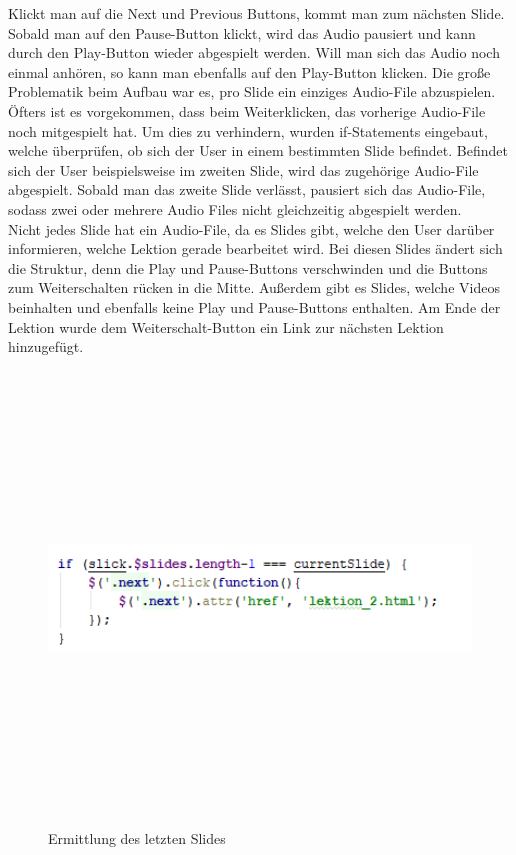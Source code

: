 Klickt man auf die Next und Previous Buttons, kommt man zum nächsten Slide. Sobald man auf den Pause-Button klickt, wird das Audio pausiert und kann durch den Play-Button wieder abgespielt werden. Will man sich das Audio noch einmal anhören, so kann man ebenfalls auf den Play-Button klicken. Die große Problematik beim Aufbau war es, pro Slide ein einziges Audio-File abzuspielen. Öfters ist es vorgekommen, dass beim Weiterklicken, das vorherige Audio-File noch mitgespielt hat. Um dies zu verhindern, wurden if-Statements eingebaut, welche überprüfen, ob sich der User in einem bestimmten Slide befindet. Befindet sich der User beispielsweise im zweiten Slide, wird das zugehörige Audio-File abgespielt. Sobald man das zweite Slide verlässt, pausiert sich das Audio-File, sodass zwei oder mehrere Audio Files nicht gleichzeitig abgespielt werden. \leavevmode \\
Nicht jedes Slide hat ein Audio-File, da es Slides gibt, welche den User darüber informieren, welche Lektion gerade bearbeitet wird. Bei diesen Slides ändert sich die Struktur, denn die Play und Pause-Buttons verschwinden und die Buttons zum Weiterschalten rücken in die Mitte. Außerdem gibt es Slides, welche Videos beinhalten und ebenfalls keine Play und Pause-Buttons enthalten. Am Ende der Lektion wurde dem Weiterschalt-Button ein Link zur nächsten Lektion hinzugefügt. 
\begin{figure} [H]
	\centering
\includegraphics[width=12cm,height=12cm,keepaspectratio]{webseite_abb11} 
	\caption{Ermittlung des letzten Slides}
\end{figure}

